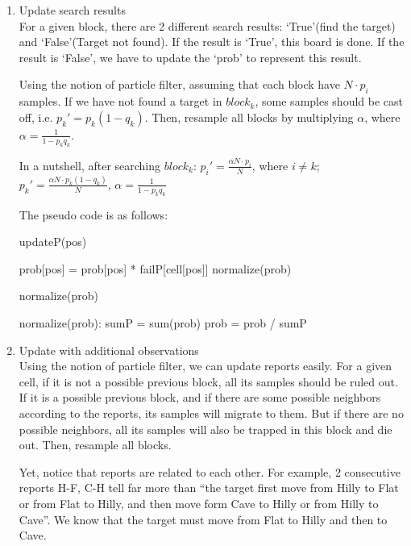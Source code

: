 \documentclass[letter]{article}
\begin{document}
\begin{enumerate}
	\item {Update search results} \\
	For a given block, there are 2 different search results: `True'(find the target) and `False'(Target not found). If the result is `True', this board is done. If the result is `False', we have to update the `prob' to represent this result.
	
	Using the notion of particle filter, assuming that each block have $N \cdot p_i$ samples. If we have not found a target in $block_k$, some samples should be cast off, i.e. $p_k' = p_k(1-q_k)$. Then, resample all blocks by multiplying $\alpha$, where $\alpha = \frac{1}{1-p_kq_k}$.
	
	In a nutshell, after searching $block_k$: 
	$p_i' = \frac{\alpha N \cdot p_i}{N}$, where $i\ne k$; 
	$p_k' = \frac{\alpha N \cdot p_k(1-q_k)}{N}$,
	$\alpha = \frac{1}{1-p_kq_k}$
	
	The pseudo code is as follows:
	\begin{algorithm}[H]
		\caption{updateP(pos)}
		\begin{algorithmic}
			\STATE prob[pos] = prob[pos] * failP[cell[pos]]
			\STATE normalize(prob)
			\RETURN 
		\end{algorithmic}
	\end{algorithm}
	\begin{algorithm}[H]
		\caption{normalize(prob)}
		\begin{algorithmic}
			\STATE normalize(prob):
			\STATE sumP = sum(prob)
			\STATE prob = prob / sumP
			\RETURN 
		\end{algorithmic}
	\end{algorithm}
	
	\item {Update with additional observations} \\
	Using the notion of particle filter, we can update reports easily. For a given cell, if it is not a possible previous block, all its samples should be ruled out. If it is a possible previous block, and if there are some possible neighbors according to the reports, its samples will migrate to them. But if there are no possible neighbors, all its samples will also be trapped in this block and die out. Then, resample all blocks.
	
	Yet, notice that reports are related to each other. For example, 2 consecutive reports H-F, C-H tell far more than ``the target first move from Hilly to Flat or from Flat to Hilly, and then move form Cave to Hilly or from Hilly to Cave''. We know that the target must move from Flat to Hilly and then to Cave.
	

\end{enumerate}
\end{document}
